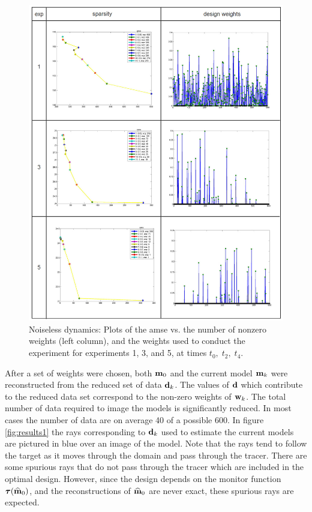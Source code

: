 \documentclass[leqno,onefignum,onetabnum]{siamltexmm}
\newcommand{\bfd}	{{\bf{d}}}
\newcommand{\bfm}	{{\bf{m}}}
\newcommand{\bfw}	{{\bf{w}}}
\newcommand{\bftau}      {{\boldsymbol \tau}}
\newcommand{\bfmhat}    {{\widehat{\bfm}}}
\begin{document}
\begin{figure}
	\renewcommand{\arraystretch}{1.5}
	\begin{center}
		\iwidth=130mm
					\includegraphics[width=1\iwidth]{figures/risk}
	\end{center}
	\caption{Noiseless dynamics: Plots of the amse  vs. the number of nonzero weights (left column), and the weights used to conduct the experiment for experiments 1, 3, and 5, at times $t_0,\; t_2,\; t_4$.}
	\label{fig:weights1}
\end{figure}
After a set of weights were chosen, both $\bfm_0$ and the current model $\bfm_k$ were reconstructed from the reduced set of data $\bfd_k$. The values of $\bfd$ which contribute to the reduced data set correspond to the non-zero weights of $\bfw_k$. The total number of data required to image the models is significantly reduced. In most cases the number of data are on average  40 of a possible 600.
  In figure \ref{fig:results1} the rays corresponding to $\bfd_k$ used to estimate the current models are pictured in blue over an image of the model. Note that the rays tend to follow the target as it moves through the domain and pass through the tracer.
There are some spurious rays that do not pass through the tracer which are included in the optimal design. However, since the design depends on the monitor function  $\bftau(\bfmhat_0)$, and the reconstructions of $\bfmhat_0$ are never exact,  these spurious rays are expected. 
\end{document}
